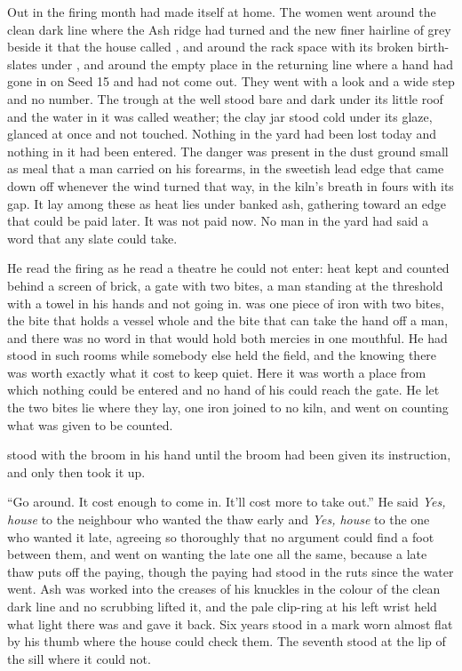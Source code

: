 Out in  the firing month had made itself at home. The women went around the clean dark line where the Ash ridge had turned and the new finer hairline of grey beside it that the house called , and around the rack space with its broken birth-slates under , and around the empty place in the returning line where a hand had gone in on Seed 15 and had not come out. They went with a look and a wide step and no number. The trough at the well stood bare and dark under its little roof and the water in it was called weather; the clay jar stood cold under its glaze, glanced at once and not touched. Nothing in the yard had been lost today and nothing in it had been entered. The danger was present in the dust ground small as meal that a man carried on his forearms, in the sweetish lead edge that came down off  whenever the wind turned that way, in the kiln's breath in fours with its gap. It lay among these as heat lies under banked ash, gathering toward an edge that could be paid later. It was not paid now. No man in the yard had said a word that any slate could take.

He read the firing as he read a theatre he could not enter: heat kept and counted behind a screen of brick, a gate with two bites, a man standing at the threshold with a towel in his hands and not going in.  was one piece of iron with two bites, the bite that holds a vessel whole and the bite that can take the hand off a man, and there was no word in  that would hold both mercies in one mouthful. He had stood in such rooms while somebody else held the field, and the knowing there was worth exactly what it cost to keep quiet. Here it was worth a place from which nothing could be entered and no hand of his could reach the gate. He let the two bites lie where they lay, one iron joined to no kiln, and went on counting what was given to be counted.

 stood with the broom in his hand until the broom had been given its instruction, and only then took it up.

“Go around. It cost enough to come in. It'll cost more to take out.” He said \emph{Yes, house} to the neighbour who wanted the thaw early and \emph{Yes, house} to the one who wanted it late, agreeing so thoroughly that no argument could find a foot between them, and went on wanting the late one all the same, because a late thaw puts off the paying, though the paying had stood in the ruts since the water went. Ash was worked into the creases of his knuckles in the colour of the clean dark line and no scrubbing lifted it, and the pale clip-ring at his left wrist held what light there was and gave it back. Six years stood in a mark worn almost flat by his thumb where the house could check them. The seventh stood at the lip of the sill where it could not.


